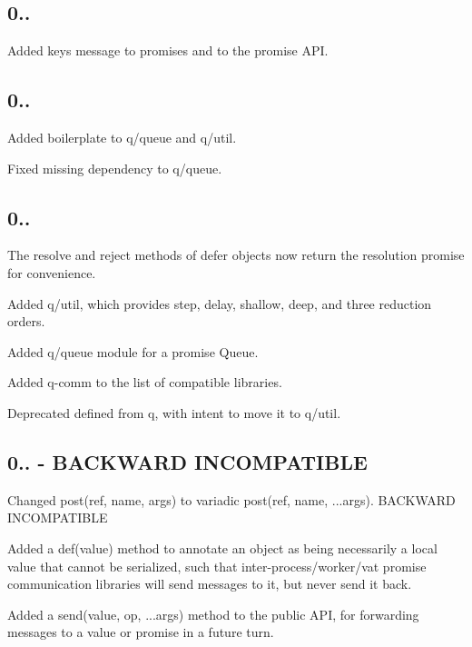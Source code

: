 \subsection*{0..}


\begin{DoxyItemize}
\item Added {\ttfamily keys} message to promises and to the promise A\+PI.
\end{DoxyItemize}

\subsection*{0..}


\begin{DoxyItemize}
\item Added boilerplate to {\ttfamily q/queue} and {\ttfamily q/util}.
\item Fixed missing dependency to {\ttfamily q/queue}.
\end{DoxyItemize}

\subsection*{0..}


\begin{DoxyItemize}
\item The {\ttfamily resolve} and {\ttfamily reject} methods of {\ttfamily defer} objects now return the resolution promise for convenience.
\item Added {\ttfamily q/util}, which provides {\ttfamily step}, {\ttfamily delay}, {\ttfamily shallow}, {\ttfamily deep}, and three reduction orders.
\item Added {\ttfamily q/queue} module for a promise {\ttfamily Queue}.
\item Added {\ttfamily q-\/comm} to the list of compatible libraries.
\item Deprecated {\ttfamily defined} from {\ttfamily q}, with intent to move it to {\ttfamily q/util}.
\end{DoxyItemize}

\subsection*{0.. -\/ B\+A\+C\+K\+W\+A\+RD I\+N\+C\+O\+M\+P\+A\+T\+I\+B\+LE}


\begin{DoxyItemize}
\item Changed post(ref, name, args) to variadic post(ref, name, ...args). B\+A\+C\+K\+W\+A\+RD I\+N\+C\+O\+M\+P\+A\+T\+I\+B\+LE
\item Added a def(value) method to annotate an object as being necessarily a local value that cannot be serialized, such that inter-\/process/worker/vat promise communication libraries will send messages to it, but never send it back.
\item Added a send(value, op, ...args) method to the public A\+PI, for forwarding messages to a value or promise in a future turn.
\end{DoxyItemize}

